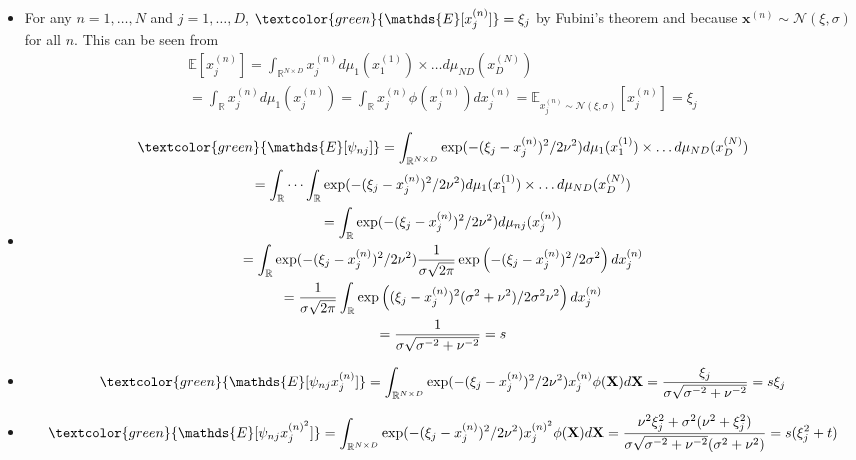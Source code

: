         \begin{itemize}
            \item For any $n=1,\ldots,N$ and $j=1,\ldots, D$, $\textcolor{green}{\mathds{E}[x^{(n)}_j]} = \xi_j$ by Fubini's theorem and because $\mathbf{x}^{(n)} \sim \mathcal{N}(\xi,\sigma)$ for all $n$. This can be seen from
            \begin{gather*}
                \mathds{E}[x^{(n)}_j] = \int_{\mathbb{R}^{N\times D}} x^{(n)}_j d\mu_1(x^{(1)}_1) \times \ldots d\mu_{ND}(x^{(N)}_D)  \\
                = \int_{\mathbb{R}} x^{(n)}_j d\mu_1(x^{(n)}_j) 
                = \int_{\mathbb{R}} x^{(n)}_j \phi(x^{(n)}_j)dx^{(n)}_j 
                = \mathds{E}_{x^{(n)}_j \sim \mathcal{N}(\xi,\sigma)}[x^{(n)}_j] 
                = \xi_j
            \end{gather*}
            \item 
            \begin{gather*}
            \textcolor{green}{\mathds{E}[\psi_{nj}]} = \int_{\mathbb{R}^{N\times D}} \exp(-(\xi_j - x^{(n)}_j)^2/2\nu^2) d\mu_1(x^{(1)}_1) \times \ldots d\mu_{ND}(x^{(N)}_D) \\
            = \int_\mathbb{R} \cdots \int_\mathbb{R} \exp(-(\xi_j - x^{(n)}_j)^2/2\nu^2) d\mu_1(x^{(1)}_1) \times \ldots d\mu_{ND}(x^{(N)}_D) \\ 
            = \int_\mathbb{R}\exp(-(\xi_j - x^{(n)}_j)^2/2\nu^2) d\mu_{nj}(x^{(n)}_j) \\
            = \int_\mathbb{R}\exp(-(\xi_j - x^{(n)}_j)^2/2\nu^2) \frac{1}{\sigma \sqrt{2\pi}}\exp\left(-(\xi_j-x^{(n)}_j)^2/2\sigma^2\right) dx^{(n)}_j \\
            = \frac{1}{\sigma \sqrt{2\pi}} \int_\mathbb{R} \exp\left((\xi_j - x^{(n)}_j)^2(\sigma^2 + \nu^2)/2\sigma^2 \nu^2\right) dx^{(n)}_j\\
            =\frac{1}{\sigma \sqrt{\sigma^{-2} + \nu^{-2}}}=s
            \end{gather*}
            \item \[\textcolor{green}{\mathds{E}[\psi_{nj}x^{(n)}_j]} = \int_{\mathbb{R}^{N\times D}} \exp(-(\xi_j - x^{(n)}_j)^2/2\nu^2) x^{(n)}_j \phi(\mathbf{X}) d\mathbf{X} = \frac{\xi_j}{\sigma \sqrt{\sigma^{-2} +\nu^{-2}}}=s \xi_j\]
            \item \[\textcolor{green}{\mathds{E}[\psi_{nj} x^{{(n)}^2}_j]}= \int_{\mathbb{R}^{N\times D}} \exp(-(\xi_j - x^{(n)}_j)^2/2\nu^2) x^{{(n)}^2}_j \phi(\mathbf{X}) d\mathbf{X} = \frac{\nu^2 \xi_j^2 + \sigma^2(\nu^2+\xi_j^2)}{\sigma\sqrt{\sigma^{-2} + \nu^{-2}}(\sigma^2+\nu^2)}=s(\xi_j^2+t)\]
        \end{itemize}

